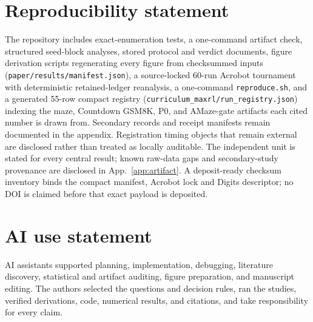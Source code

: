 \section*{Reproducibility statement}
The repository includes exact-enumeration tests, a one-command artifact
check, structured seed-block analyses, stored protocol and verdict documents,
figure derivation scripts regenerating every figure from checksummed inputs
(\texttt{paper/results/manifest.json}), a source-locked 60-run Acrobot
tournament with deterministic retained-ledger reanalysis, a one-command
\texttt{reproduce.sh}, and a generated 55-row compact registry
(\texttt{curriculum\_maxrl/run\_registry.json}) indexing the maze, Countdown
GSM8K, P0, and AMaze-gate artifacts each cited number is drawn from. Secondary
records and receipt manifests remain documented in the appendix. Registration
timing objects that remain external are disclosed rather than treated as
locally auditable.
The independent unit is stated for every central result; known raw-data gaps
and secondary-study provenance are disclosed in App.~\ref{app:artifact}. A
deposit-ready checksum inventory binds the compact manifest, Acrobot lock and
Digits descriptor; no DOI is claimed before that exact payload is deposited.

\section*{AI use statement}
AI assistants supported planning, implementation, debugging, literature
discovery, statistical and artifact auditing, figure preparation, and
manuscript editing. The authors selected the questions and decision rules,
ran the studies, verified derivations, code, numerical results, and
citations, and take responsibility for every claim.

